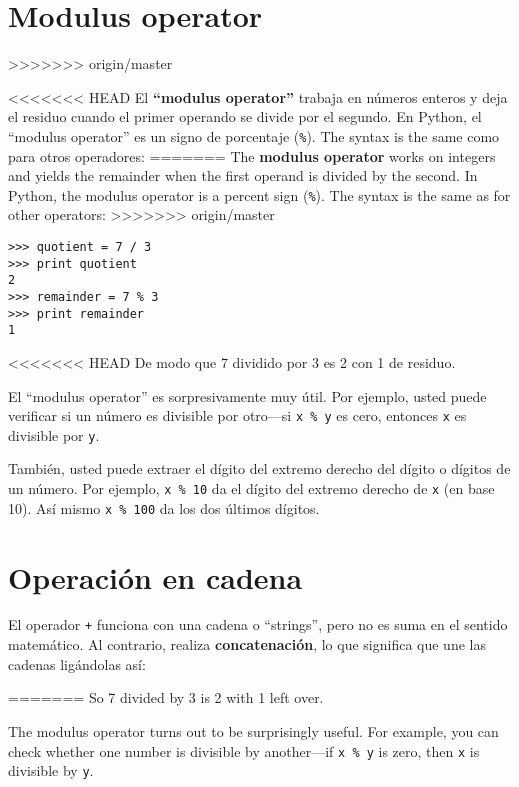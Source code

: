 \begin{ex}
\section{Modulus operator}
>>>>>>> origin/master


<<<<<<< HEAD
El {\bf ``modulus operator''} trabaja en n\'umeros enteros y deja el residuo cuando el primer operando se divide por el segundo. En Python, el 
``modulus operator'' es un signo de porcentaje (\verb"%").  The syntax is the same
como para otros operadores:
=======
The {\bf modulus operator} works on integers and yields the remainder
when the first operand is divided by the second.  In Python, the
modulus operator is a percent sign (\verb"%").  The syntax is the same
as for other operators:
>>>>>>> origin/master

\beforeverb
\begin{verbatim}
>>> quotient = 7 / 3
>>> print quotient
2
>>> remainder = 7 % 3
>>> print remainder
1
\end{verbatim}
\afterverb
%
<<<<<<< HEAD
De modo que 7 dividido por 3 es 2 con 1 de residuo.

El ``modulus operator'' es sorpresivamente muy \'util. Por ejemplo, usted puede verificar si un n\'umero es divisible por otro---si
{\tt x \% y} es cero, entonces {\tt x} es divisible por {\tt y}.


Tambi\'en, usted puede extraer el d\'igito del extremo derecho del d\'igito o d\'igitos de un n\'umero. Por ejemplo, {\tt x \% 10} da el d\'igito del extremo derecho de {\tt x} (en base 10).  As\'i mismo {\tt x \% 100}
da los dos \'ultimos d\'igitos.



\section{Operaci\'on en cadena}

El operador {\tt +} funciona con una cadena o ``strings'', pero no es suma en el sentido matem\'atico. Al contrario, realiza 
{\bf concatenaci\'on}, lo que significa que une las cadenas lig\'andolas as\'i:

=======
So 7 divided by 3 is 2 with 1 left over.

The modulus operator turns out to be surprisingly useful.  For
example, you can check whether one number is divisible by another---if
{\tt x \% y} is zero, then {\tt x} is divisible by {\tt y}.


\end{ex}

